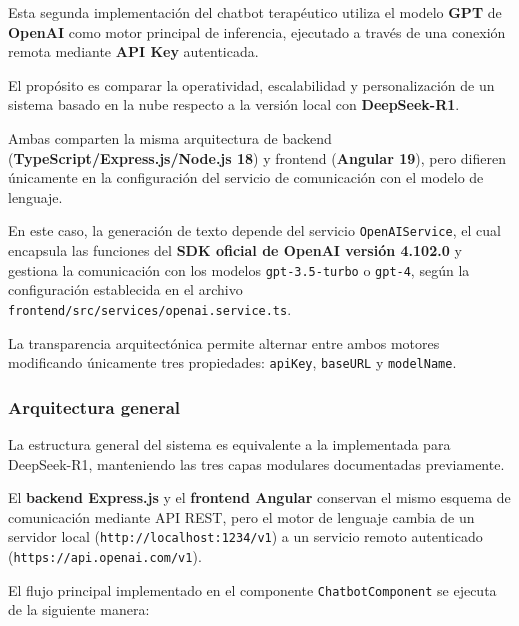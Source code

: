 \documentclass[12pt,a4paper]{report}
\numberwithin{figure}{section}
\begin{document}
Esta segunda implementación del chatbot terapéutico utiliza el modelo \textbf{GPT} de \textbf{OpenAI} como motor principal de inferencia, ejecutado a través de una conexión remota mediante \textbf{API Key} autenticada.  

El propósito es comparar la operatividad, escalabilidad y personalización de un sistema basado en la nube respecto a la versión local con \textbf{DeepSeek-R1}.  

Ambas comparten la misma arquitectura de backend (\textbf{TypeScript\slash Express.js\slash Node.js 18}) y frontend (\textbf{Angular 19}), pero difieren únicamente en la configuración del servicio de comunicación con el modelo de lenguaje.

En este caso, la generación de texto depende del servicio \texttt{OpenAIService}, el cual encapsula las funciones del \textbf{SDK oficial de OpenAI versión 4.102.0} y gestiona la comunicación con los modelos \texttt{gpt-3.5-turbo} o \texttt{gpt-4}, según la configuración establecida en el archivo \texttt{frontend\slash src\slash services\slash openai.service.ts}. 

La transparencia arquitectónica permite alternar entre ambos motores modificando únicamente tres propiedades: \texttt{apiKey}, \texttt{baseURL} y \texttt{modelName}.

\vspace{1em}
\subsubsection{Arquitectura general}
\label{subsubsec:arquitectura_general_openai}

La estructura general del sistema es equivalente a la implementada para DeepSeek-R1, manteniendo las tres capas modulares documentadas previamente.  

El \textbf{backend Express.js} y el \textbf{frontend Angular} conservan el mismo esquema de comunicación mediante API REST, pero el motor de lenguaje cambia de un servidor local (\texttt{http:\slash\slash localhost:1234\slash v1}) a un servicio remoto autenticado (\texttt{https:\slash\slash api.openai.com\slash v1}).  

El flujo principal implementado en el componente \texttt{ChatbotComponent} se ejecuta de la siguiente manera:
\end{document}
